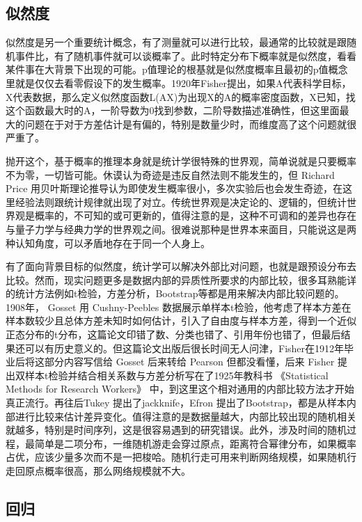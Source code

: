 \documentclass[]{tufte-book}
\begin{document}
\hypertarget{ux4f3cux7136ux5ea6}{%
\subsection{似然度}\label{ux4f3cux7136ux5ea6}}

似然度是另一个重要统计概念，有了测量就可以进行比较，最通常的比较就是跟随机事件比，有了随机事件就可以谈概率了。此时特定分布下概率就是似然度，看看某件事在大背景下出现的可能。p值理论的根基就是似然度概率且最初的p值概念里就是仅仅去看零假设下的发生概率。1920年Fisher提出，如果A代表科学目标，X代表数据，那么定义似然度函数L(A\textbar X)为出现X的A的概率密度函数，X已知，找这个函数最大时的A，一阶导数为0找到参数，二阶导数描述准确性，但这里面最大的问题在于对于方差估计是有偏的，特别是数量少时，而维度高了这个问题就很严重了。

抛开这个，基于概率的推理本身就是统计学很特殊的世界观，简单说就是只要概率不为零，一切皆可能。休谟认为奇迹是违反自然法则不能发生的，但 Richard Price 用贝叶斯理论推导认为即使发生概率很小，多次实验后也会发生奇迹，在这里经验法则跟统计规律就出现了对立。传统世界观是决定论的、逻辑的，但统计世界观是概率的，不可知的或可更新的，值得注意的是，这种不可调和的差异也存在与量子力学与经典力学的世界观之间。很难说那种是世界本来面目，只能说这是两种认知角度，可以矛盾地存在于同一个人身上。

有了面向背景目标的似然度，统计学可以解决外部比对问题，也就是跟预设分布去比较。然而，现实问题更多是数据内部的异质性所要求的内部比较，很多耳熟能详的统计方法例如t检验，方差分析，Bootstrap等都是用来解决内部比较问题的。1908年， Gosset 用 Cushny-Peebles 数据展示单样本t检验，他考虑了样本方差在样本数较少且总体方差未知时如何估计，引入了自由度与样本方差，得到一个近似正态分布的t分布，这篇论文印错了数、分类也错了、引用年份也错了，但最后结果还可以有历史意义的。但这篇论文出版后很长时间无人问津，Fisher在1912年毕业后将这部分内容写信给 Gosset 后来转给 Pearson 但都没看懂，后来 Fisher 提出双样本t检验并结合相关系数与方差分析写在了1925年教科书 《Statistical Methods for Research Workers》 中，到这里这个相对通用的内部比较方法才开始真正流行。再往后Tukey 提出了jackknife，Efron 提出了Bootstrap，都是从样本内部进行比较来估计差异变化。值得注意的是数据量越大，内部比较出现的随机相关就越多，特别是时间序列，这是很容易遇到的研究错误。此外，涉及时间的随机过程，最简单是二项分布，一维随机游走会穿过原点，距离符合幂律分布，如果概率占优，应该少量多次而不是一把梭哈。随机行走可用来判断网络规模，如果随机行走回原点概率很高，那么网络规模就不大。

\hypertarget{ux56deux5f52}{%
\subsection{回归}\label{ux56deux5f52}}
\end{document}
